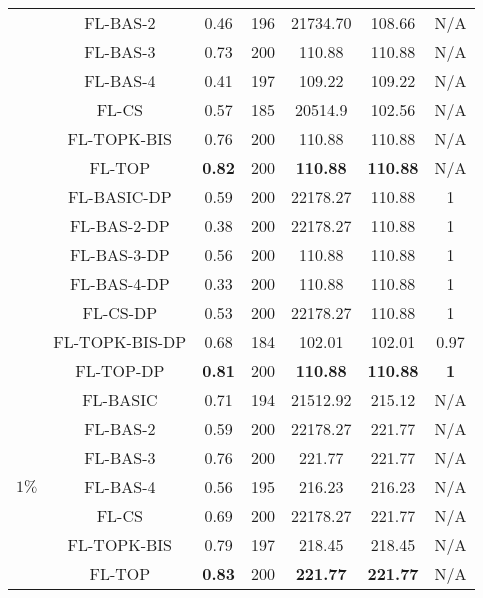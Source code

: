\documentclass[accepted]{uai2021} %
\begin{document}
\begin{table*}[!ht]
{\begin{tabular}{|c|c|c|c|c|c|c|}
        \cline{2-7}
        &  FL-BAS-2  &  0.46  & 196 & 21734.70 & 108.66 & N/A  \\
        \cline{2-7}
        &  FL-BAS-3  &  0.73  & 200 & 110.88 & 110.88 & N/A  \\
        \cline{2-7}
        &  FL-BAS-4  & 0.41  & 197 & 109.22 & 109.22 & N/A  \\
        \cline{2-7}
        &  FL-CS  &  0.57  & 185 & 20514.9 & 102.56 & N/A  \\
        \cline{2-7}
        &  FL-TOPK-BIS  &  0.76  & 200 & 110.88 & 110.88 & N/A  \\
        \cline{2-7}
        &  FL-TOP   & \textbf{0.82}  & 200 & \textbf{110.88} & \textbf{110.88} & N/A \\
        \cline{2-7}
        \cline{2-7}
        &  FL-BASIC-DP   &  0.59  & 200 & 22178.27 & 110.88 & 1\\
        \cline{2-7}
        &  FL-BAS-2-DP  &  0.38 & 200  & 22178.27 & 110.88 & 1\\
        \cline{2-7}
        &  FL-BAS-3-DP  & 0.56   & 200 & 110.88 & 110.88 & 1\\
        \cline{2-7}
        &  FL-BAS-4-DP  &  0.33  & 200 & 110.88 & 110.88 & 1\\
        \cline{2-7}
        &  FL-CS-DP  &  0.53  & 200 & 22178.27 & 110.88 & 1\\
        \cline{2-7}
        &  FL-TOPK-BIS-DP  &  0.68  & 184 & 102.01 & 102.01 & 0.97\\
        \cline{2-7}
        &  FL-TOP-DP   & \textbf{0.81} & 200 & \textbf{110.88}  & \textbf{110.88} & \textbf{1}\\
        \hline 
        \hline
        \multirow{14}{*}{$1\%$} &  FL-BASIC   &  0.71  & 194 & 21512.92 & 215.12 & N/A  \\
        \cline{2-7}
        &  FL-BAS-2  &  0.59  & 200 & 22178.27 & 221.77 & N/A  \\
        \cline{2-7}
        &  FL-BAS-3  &  0.76  & 200 & 221.77 & 221.77 & N/A  \\
        \cline{2-7}
        &  FL-BAS-4  & 0.56  & 195 & 216.23 & 216.23 & N/A  \\
        \cline{2-7}
        &  FL-CS  &  0.69  & 200 & 22178.27 & 221.77 &N/A  \\
        \cline{2-7}
        &  FL-TOPK-BIS  &  0.79  & 197 & 218.45 & 218.45 & N/A  \\
        \cline{2-7}
        &  FL-TOP   & \textbf{0.83}  & 200 & \textbf{221.77} & \textbf{221.77} & N/A \\

\end{tabular}}
\end{table*}
\end{document}
